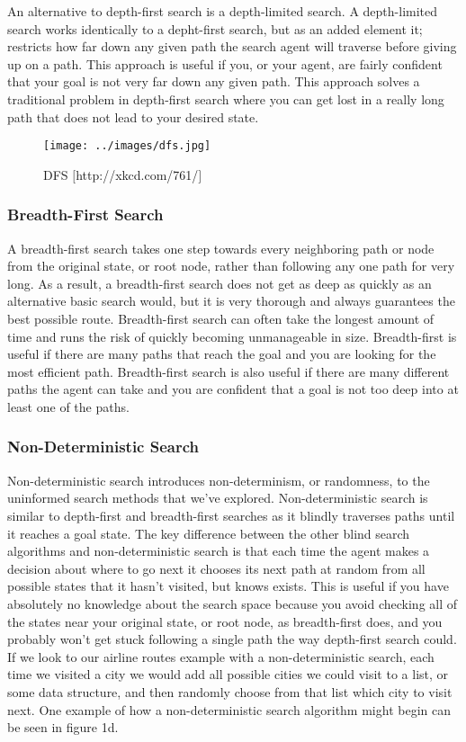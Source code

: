 An alternative to depth-first search is a depth-limited
search. \cite{russell2003}  A depth-limited search works identically to a
depht-first search, but as an added element it; restricts how far down any given
path the search agent will traverse before giving up on a path.  This approach
is useful if you, or your agent, are fairly confident that your goal is not very
far down any given path.  This approach solves a traditional problem in
depth-first search where you can get lost in a really long path that does not
lead to your desired state.

\begin{figure}[h!]
    \centering
    \texttt{[image: ../images/dfs.jpg]}
    \caption{DFS $[$http://xkcd.com/761/$]$}
\end{figure}

\subsubsection{Breadth-First Search}
A breadth-first search takes one step towards every neighboring path or node
from the original state, or root node, rather than following any one path for
very long.  As a result, a breadth-first search does not get as deep as quickly
as an alternative basic search would, but it is very thorough and always
guarantees the best possible route.  Breadth-first search can often take the
longest amount of time and runs the risk of quickly becoming unmanageable in
size.  Breadth-first is useful if there are many paths that reach the goal and
you are looking for the most efficient path.  Breadth-first search is also
useful if there are many different paths the agent can take and you are
confident that a goal is not too deep into at least one of the paths.

\subsubsection{Non-Deterministic Search}
Non-deterministic search introduces non-determinism, or randomness, to the
uninformed search methods that we've explored.  Non-deterministic search is
similar to depth-first and breadth-first searches as it blindly traverses paths
until it reaches a goal state.  The key difference between the other blind
search algorithms and non-deterministic search is that each time the agent makes
a decision about where to go next it chooses its next path at random from all
possible states that it hasn't visited, but knows exists.  This is useful if you
have absolutely no knowledge about the search space because you avoid checking
all of the states near your original state, or root node, as breadth-first does,
and you probably won't get stuck following a single path the way depth-first
search could.  If we look to our airline routes example with a non-deterministic
search, each time we visited a city we would add all possible cities we could
visit to a list, or some data structure, and then randomly choose from that
list which city to visit next.  One example of how a non-deterministic search
algorithm might begin can be seen in figure 1d.

